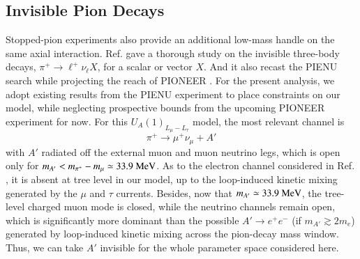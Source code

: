 \documentclass[onecolumn, aps, nofootinbib, prd, preprint, floats, floatfix, amsmath, amssymb, superscriptaddress, preprintnumbers]{revtex4-1}
\begin{document}
\subsection{Invisible Pion Decays}
\label{subsec:pion-invisible}

Stopped-pion experiments also provide an additional low-mass handle on the same axial interaction. Ref. \cite{Altmannshofer:2026opc} gave a thorough study on the invisible three-body decays, $\pi^+\to \ell^+\nu_\ell X$, for a scalar or vector $X$. And it also recast the PIENU search \cite{PIENU:2021clt} while projecting the reach of PIONEER \cite{PIONEER:2022yag,PIONEER:2022alm}. For the present analysis, we adopt existing results from the PIENU experiment to place constraints on our model, while neglecting prospective bounds from the upcoming PIONEER experiment for now. For this $U_A(1)_{L_\mu-L_\tau}$ model, the most relevant channel is
\begin{equation}
    \pi^+\to \mu^+ \nu_\mu +A'
\end{equation}
with $A'$ radiated off the external muon and muon neutrino legs, which is open only for $m_{A'}<m_{\pi^+}-m_\mu\simeq33.9~{\rm MeV}$. As to the electron channel considered in Ref. \cite{Altmannshofer:2026opc}, it is absent at tree level in our model, up to the loop-induced kinetic mixing generated by the $\mu$ and $\tau$ currents. Besides, now that $m_{A'}\simeq33.9~{\rm MeV}$, the tree-level charged muon mode is closed, while the neutrino channels remain open, which is significantly more dominant than the possible $A'\to e^+e^-$ (if $m_{A'}\gtrsim 2m_e$) generated by loop-induced kinetic mixing across the pion-decay mass window. Thus, we can take $A'$ invisible for the whole parameter space considered here.
\end{document}
